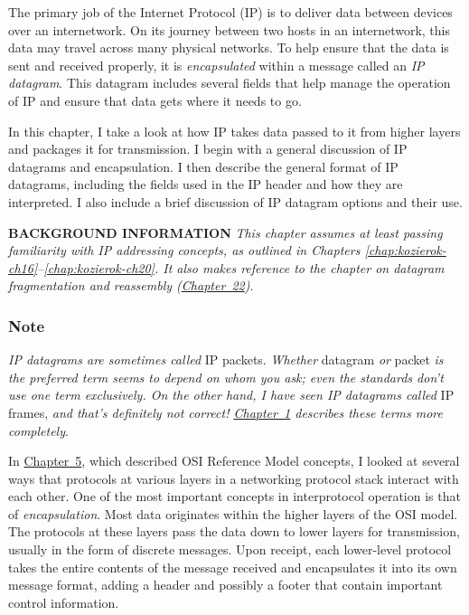 \documentclass[b5paper,11pt]{memoir}
\begin{document}
The primary job of the Internet Protocol (IP) is to deliver data between
devices over an internetwork. On its journey between two hosts in an
internetwork, this data may travel across many physical networks. To
help ensure that the data is sent and received properly, it is
{\emph{encapsulated}} within a message called an {\emph{IP datagram}}.
This datagram includes several fields that help manage the operation of
IP and ensure that data gets where it needs to go.

In this chapter, I take a look at how IP takes data passed to it from
higher layers and packages it for transmission. I begin with a general
discussion of IP datagrams and encapsulation. I then describe the
general format of IP datagrams, including the fields used in the IP
header and how they are interpreted. I also include a brief discussion
of IP datagram options and their use.


{\textbf{BACKGROUND INFORMATION}} {\emph{This chapter assumes at least
passing familiarity with IP addressing concepts, as outlined in Chapters
\vref{chap:kozierok-ch16}--\vref{chap:kozierok-ch20}.
It also makes reference to the chapter on datagram fragmentation and
reassembly (\protect\hyperlink{ch22.html}{Chapter~22})}}.

\subsubsection[Note]{\texorpdfstring{\protect\hypertarget{ch21.htmlux5cux23note-80}{}{}Note}{Note}}

\protect\hypertarget{ch21.htmlux5cux23idx-CHP-21-0773}{}{}{\emph{IP
datagrams are sometimes called}} IP packets. {\emph{Whether}} datagram
{\emph{or}} packet {\emph{is the preferred term seems to depend on whom
you ask; even the standards don't use one term exclusively. On the other
hand, I have seen IP datagrams called}} IP frames, {\emph{and that's
definitely not correct! \protect\hyperlink{ch01.html}{Chapter~1}
describes these terms more completely}}.

\protect\hypertarget{ch21.htmlux5cux23idx-CHP-21-0774}{}{}In
\protect\hyperlink{ch05.html}{Chapter~5}, which described OSI Reference
Model concepts, I looked at several ways that protocols at various
layers in a networking protocol stack interact with each other. One of
the most important concepts in interprotocol operation is that of
{\emph{encapsulation}}. Most data originates within the higher layers of
the OSI model. The protocols at these layers pass the data down to lower
layers for transmission, usually in the form of discrete messages. Upon
receipt, each lower-level protocol takes the entire contents of the
message received and encapsulates it into its own message format, adding
a header and possibly a footer that contain important control
information.
\end{document}
